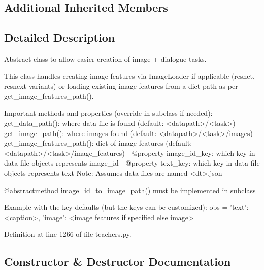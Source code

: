 \subsection*{Additional Inherited Members}


\subsection{Detailed Description}
\begin{DoxyVerb}Abstract class to allow easier creation of image + dialogue tasks.

This class handles creating image features via ImageLoader if applicable
(resnet, resnext variants) or loading existing image features from a dict
path as per get_image_features_path().

Important methods and properties (override in subclass if needed):
- get_data_path(): where data file is found (default: <datapath>/<task>)
- get_image_path(): where images found (default: <datapath>/<task>/images)
- get_image_features_path(): dict of image features (default:
  <datapath>/<task>/image_features)
- @property image_id_key: which key in data file objects represents image_id
- @property text_key: which key in data file objects represents text
Note: Assumes data files are named <dt>.json

@abstractmethod image_id_to_image_path() must be implemented in
subclass

Example with the key defaults (but the keys can be customized):
obs = {'text': <caption>,
    'image': <image features if specified else image>
    }
\end{DoxyVerb}
 

Definition at line 1266 of file teachers.\+py.



\subsection{Constructor \& Destructor Documentation}
\mbox{\label{classparlai_1_1core_1_1teachers_1_1AbstractImageTeacher_aab36cededc1817fee5109293bd62c51d}} 
